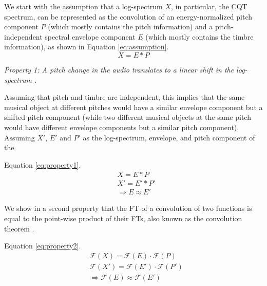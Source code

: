 \documentclass[journal]{IEEEtran}
\begin{document}
We start with the assumption that a log-spectrum $X$, in particular, the CQT spectrum, can be represented as the convolution of an energy-normalized pitch component $P$ (which mostly contains the pitch information) and a pitch-independent spectral envelope component $E$ (which mostly contains the timbre information), as shown in Equation \ref{eq:assumption}.
\begin{equation}
\label{eq:assumption}
X = E * P
\end{equation}

\emph{Property 1: A pitch change in the audio translates to a linear shift in the log-spectrum \cite{brown1991, brown1992}.}

Assuming that pitch and timbre are independent, this implies that the same musical object at different pitches would have a similar envelope component but a shifted pitch component (while two different musical objects at the same pitch would have different envelope components but a similar pitch component). Assuming $X'$, $E'$ and $P'$ as the log-spectrum, envelope, and pitch component of the 



Equation \ref{eq:property1}.
\begin{equation}
\label{eq:property1}
\begin{split}
&X = E * P \\
&X' = E' * P' \\
&\Rightarrow E \approx E'
\end{split}
\end{equation}


We show in a second property that the FT of a convolution of two functions is equal to the point-wise product of their FTs, also known as the convolution theorem \cite{proakis1995}.

Equation \ref{eq:property2}.
\begin{equation}
\label{eq:property2}
\begin{split}
&\mathcal{F}(X) = \mathcal{F}(E) \cdot \mathcal{F}(P) \\
&\mathcal{F}(X') = \mathcal{F}(E') \cdot \mathcal{F}(P') \\
&\Rightarrow \mathcal{F}(E) \approx \mathcal{F}(E')
\end{split}
\end{equation}
\end{document}
